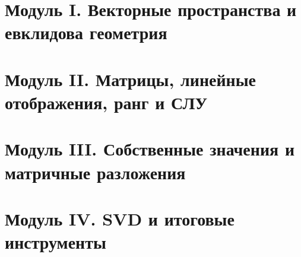 \section{Модуль I. Векторные пространства и евклидова геометрия}


\section{Модуль II. Матрицы, линейные отображения, ранг и СЛУ}


\section{Модуль III. Собственные значения и матричные разложения}


\section{Модуль IV. SVD и итоговые инструменты}
